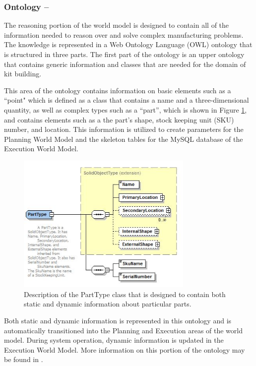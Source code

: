 \subsubsection{Ontology --}
\label{sect:Ontology}
The reasoning portion of the world model is designed to contain all of the information needed to reason over and solve complex manufacturing
problems. The knowledge is represented in a Web Ontology Language (OWL) ontology that is structured in three parts. The first part of the ontology is an upper ontology
that contains generic information and classes that are needed for the domain of kit building. 

This area of the ontology contains information on basic elements such as a ``point" which is defined as a class that contains a name 
and a three-dimensional quantity, as well as complex types such as a ``part'', which is
shown in Figure \ref{fig:part}, and
contains elements such as a the part's shape, stock keeping unit (SKU) number, and location. This information is utilized to create parameters for the Planning World
Model and the skeleton tables for the MySQL database of the Execution World Model.
%
\begin{figure}[htb!]
\begin{center}
\includegraphics[width=8.5cm]{images/Part.jpg}
\caption{Description of the PartType class that is designed to contain both static and dynamic information about particular parts.}
\label{fig:part}
\end{center}
\end{figure}
%
Both static and dynamic information is represented in this
ontology and is automatically transitioned into the Planning and Execution areas of the world model. During system
operation,  dynamic information is updated in the Execution World Model.
More information on this portion of the ontology may be found in \cite{Balakirsky2012-1}.


